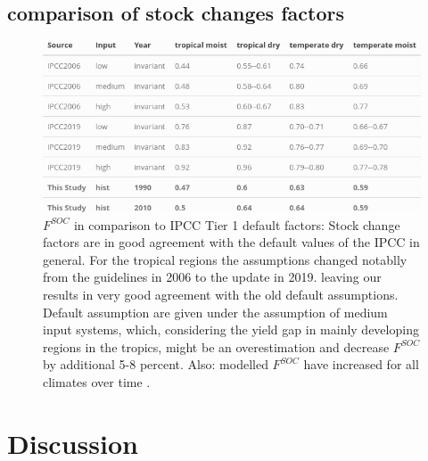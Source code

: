 \documentclass[gc, manuscript]{copernicus}
\begin{document}
\hypertarget{comparison-of-stock-changes-factors}{%
\subsection{comparison of stock changes factors}\label{comparison-of-stock-changes-factors}}

\begin{figure}[H]
\includegraphics[width=16cm]{../ResultNotebooks/Output/Images/TableSCF_comparison} \caption{$F^{SOC}$ in comparison to IPCC Tier 1 default factors: Stock change factors are in good agreement with the default values of the IPCC in general. For the tropical regions the assumptions changed notablly from the guidelines in 2006 to the update in 2019. leaving our results in very good agreement with the old default assumptions. Default assumption are given under the assumption of medium input systems, which, considering the yield gap in mainly developing regions in the tropics, might be an overestimation and decrease $F^{SOC}$ by additional 5-8 percent. Also: modelled $F^{SOC}$ have increased for all climates over time .}\label{fig:SCFtable}
\end{figure}

\newpage

\newpage

\hypertarget{discussion}{%
\section{Discussion}\label{discussion}}
\end{document}
